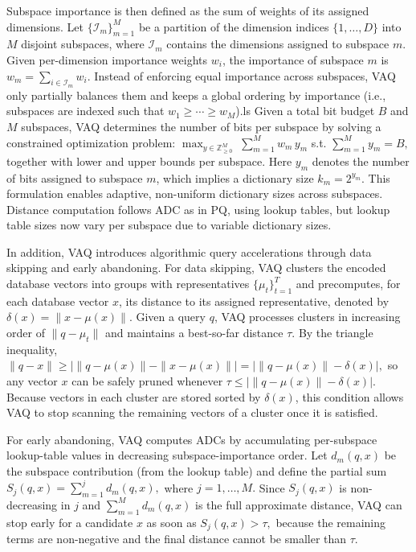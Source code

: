 \documentclass[sigconf]{acmart}
\begin{document}
Subspace importance is then defined as the sum of weights of its assigned dimensions. 
Let $\{\mathcal{I}_m\}_{m=1}^{M}$ be a partition of the dimension indices $\{1,\ldots,D\}$ into $M$ disjoint subspaces, where $\mathcal{I}_m$ contains the dimensions assigned to subspace $m$. 
Given per-dimension importance weights $w_i$, the importance of subspace $m$ is
\(w_m = \sum_{i \in \mathcal{I}_m} w_i.\)
Instead of enforcing equal importance across subspaces, VAQ only partially balances them and keeps a global ordering by importance (i.e., subspaces are indexed such that $w_1 \ge \cdots \ge w_M$).ls
Given a total bit budget $B$ and $M$ subspaces, VAQ determines the number of bits per subspace by solving a constrained optimization problem:
\(
\max_{y \in \mathbb{Z}_{\ge 0}^M} \; \sum_{m=1}^{M} w_m \, y_m \) s.t. \( \sum_{m=1}^{M} y_m = B,
\)
together with lower and upper bounds per subspace. 
Here $y_m$ denotes the number of bits assigned to subspace $m$, which implies a dictionary size $k_m = 2^{y_m}$. 
This formulation enables adaptive, non-uniform dictionary sizes across subspaces. Distance computation follows ADC as in PQ, using lookup tables, but lookup table sizes now vary per subspace due to variable dictionary sizes.

In addition, VAQ introduces algorithmic query accelerations through data skipping and early abandoning. 
For data skipping, VAQ clusters the encoded database vectors into groups with representatives $\{\mu_t\}_{t=1}^{T}$ and precomputes, for each database vector $x$, its distance to its assigned representative, denoted by $\delta(x)=\|x-\mu(x)\|$. 
Given a query $q$, VAQ processes clusters in increasing order of $\|q-\mu_t\|$ and maintains a best-so-far distance $\tau$. By the triangle inequality,
\(\|q-x\| \ge \big|\|q-\mu(x)\| - \|x-\mu(x)\|\big| = \big|\|q-\mu(x)\|-\delta(x)\big|,\)
so any vector $x$ can be safely pruned whenever
\(\tau \le \big|\|q-\mu(x)\|-\delta(x)\big|.\)
Because vectors in each cluster are stored sorted by $\delta(x)$, this condition allows VAQ to stop scanning the remaining vectors of a cluster once it is satisfied.

For early abandoning, VAQ computes ADCs by accumulating per-subspace lookup-table values in decreasing subspace-importance order. 
Let $d_m(q,x)$ be the subspace contribution (from the lookup table) and define the partial sum
\(
S_j(q,x)=\sum_{m=1}^{j} d_m(q,x),\) where \(j=1,\ldots,M.
\)
Since $S_j(q,x)$ is non-decreasing in $j$ and $\sum_{m=1}^{M} d_m(q,x)$ is the full approximate distance, VAQ can stop early for a candidate $x$ as soon as
\(
S_j(q,x) > \tau,
\)
because the remaining terms are non-negative and the final distance cannot be smaller than $\tau$.
\end{document}
